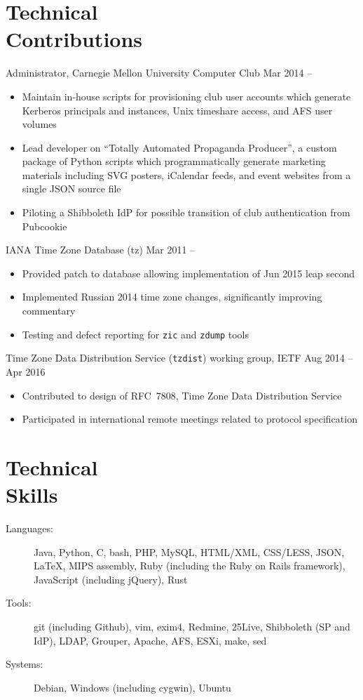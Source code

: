 \documentclass[11pt]{article}
\newcommand{\textdb}[1]{\fontseries{db}\selectfont#1\normalfont}
\newcommand{\present}{\phantom{Xxx 20XX}}
\newcommand{\itemizeonly}{\leavevmode\par\vspace{\dimexpr-\baselineskip-\parskip}}
\begin{document}
\section{Technical\\ Contributions}

\textdb{
Administrator, Carnegie Mellon University Computer Club
	\hfill Mar 2014 -- \present
}
\begin{itemize}
	\item Maintain in-house scripts for provisioning club user accounts
		which generate Kerberos principals and instances,
		Unix timeshare access, and AFS user volumes
	\item Lead developer on ``Totally Automated Propaganda Producer'',
		a custom package of Python scripts
		which programmatically generate marketing materials
		including SVG posters, iCalendar feeds, and event websites
		from a single JSON source file
	\item Piloting a Shibboleth IdP for possible transition
		of club authentication from Pubcookie
\end{itemize}

\textdb{
IANA Time Zone Database (tz)
	\hfill Mar 2011 -- \present
}
\begin{itemize}
	\item Provided patch to database allowing implementation of Jun 2015 leap second
	\item Implemented Russian 2014 time zone changes,
		significantly improving commentary
	\item Testing and defect reporting for \texttt{zic} and \texttt{zdump} tools
\end{itemize}

\textdb{
Time Zone Data Distribution Service (\texttt{tzdist}) working group, IETF
	\hfill Aug 2014 -- Apr 2016
}
\begin{itemize}
	\item Contributed to design of RFC~7808, Time Zone Data Distribution Service
	\item Participated in international remote meetings related to protocol specification
\end{itemize}



\section{Technical\\ Skills}

\itemizeonly
\begin{description}
	\item[\textdb{Languages:}] Java, Python, C, bash, PHP, MySQL, HTML/XML, CSS/LESS, JSON,
		\LaTeX, MIPS assembly, Ruby (including the Ruby on Rails framework), JavaScript (including jQuery), Rust
	\item[\textdb{Tools:}] git (including Github), vim, exim4, Redmine, 25Live, Shibboleth (SP and IdP),
		LDAP, Grouper, Apache, AFS, ESXi, make, sed
	\item[\textdb{Systems:}] Debian, Windows (including cygwin), Ubuntu
\end{description}
\end{document}
